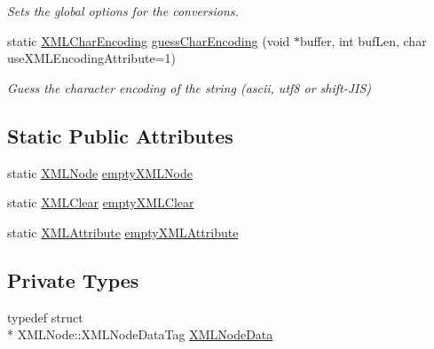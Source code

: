 \begin{DoxyCompactItemize}
\begin{DoxyCompactList}\small\item\em Sets the global options for the conversions. \end{DoxyCompactList}\item 
static \hyperlink{structXMLNode_a81bcd09f9c752b65633c1ca28ea025f2}{X\-M\-L\-Char\-Encoding} \hyperlink{group__conversions_ga2fb8e9b250d669776e5e1962a70a4196}{guess\-Char\-Encoding} (void $\ast$buffer, int buf\-Len, char use\-X\-M\-L\-Encoding\-Attribute=1)
\begin{DoxyCompactList}\small\item\em Guess the character encoding of the string (ascii, utf8 or shift-\/\-J\-I\-S) \end{DoxyCompactList}\end{DoxyCompactItemize}
\subsection*{Static Public Attributes}
\begin{DoxyCompactItemize}
\item 
static \hyperlink{structXMLNode}{X\-M\-L\-Node} \hyperlink{structXMLNode_a90565bdb240d2f14f6a3d43f15100b63}{empty\-X\-M\-L\-Node}
\item 
static \hyperlink{structXMLClear}{X\-M\-L\-Clear} \hyperlink{structXMLNode_ad32786123d26b281bfafd9325b22f47e}{empty\-X\-M\-L\-Clear}
\item 
static \hyperlink{structXMLAttribute}{X\-M\-L\-Attribute} \hyperlink{structXMLNode_afc0ee94f7b16fa825e9d06197292244d}{empty\-X\-M\-L\-Attribute}
\end{DoxyCompactItemize}
\subsection*{Private Types}
\begin{DoxyCompactItemize}
\item 
typedef struct \\*
X\-M\-L\-Node\-::\-X\-M\-L\-Node\-Data\-Tag \hyperlink{structXMLNode_a28beb729b21b81d2a59238fa755ba700}{X\-M\-L\-Node\-Data}
\end{DoxyCompactItemize}
